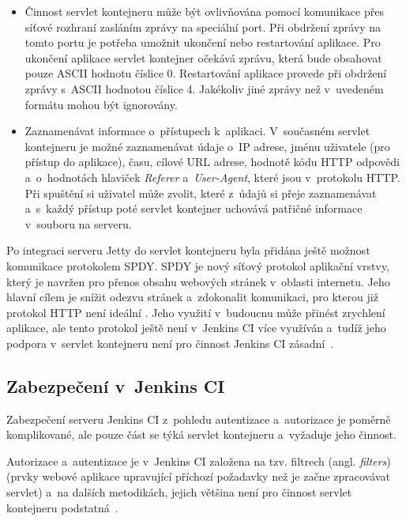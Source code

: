 \begin{itemize}
                \item Činnost servlet kontejneru může být ovlivňována pomocí komunikace přes síťové rozhraní zasláním zprávy
                    na speciální port. Při obdržení zprávy na tomto portu je potřeba umožnit ukončení nebo restartování aplikace.
                    Pro ukončení aplikace servlet kontejner očekává zprávu, která bude obsahovat pouze ASCII hodnotu číslice 0.
                    Restartování aplikace provede při obdržení zprávy s~ASCII hodnotou číslice 4. Jakékoliv
                    jiné zprávy než v~uvedeném formátu mohou být ignorovány.

                \item Zaznamenávat informace o~přístupech k~aplikaci. V~současném servlet kontejneru je možné zaznamenávat
                    údaje o~IP adrese, jménu uživatele (pro přístup do aplikace), času, cílové URL adrese, hodnotě 
                    kódu HTTP odpovědi a~o~hodnotách hlaviček \emph{Referer} a~\emph{User-Agent}, které jsou v~protokolu HTTP.
                    Při spuštění si uživatel může zvolit, které z~údajů si přeje zaznamenávat a~s~každý přístup poté 
                    servlet kontejner uchovává patřičné informace v~souboru na serveru.

            \end{itemize}
            

            Po integraci serveru Jetty do servlet kontejneru byla přidána ještě možnost
            komunikace protokolem SPDY. SPDY je nový síťový protokol aplikační vrstvy, který je
            navržen pro přenos obsahu webových stránek v~oblasti internetu. Jeho hlavní cílem je snížit odezvu stránek a~zdokonalit
            komunikaci, pro kterou již protokol HTTP není ideální \cite{spdyArticle}.
            Jeho využití v~budoucnu může přinést zrychlení aplikace, ale 
            tento protokol ještě není 
            v~Jenkins CI více využíván a~tudíž jeho podpora v~servlet kontejneru není pro činnost Jenkins CI zásadní~\cite{kohsukeTopic}.
        
        \subsection{Zabezpečení v~Jenkins CI} \label{secSecurityArchitecture}
            Zabezpečení serveru Jenkins CI z~pohledu autentizace a~autorizace je poměrně komplikované,
            ale pouze část se týká servlet kontejneru a~vyžaduje jeho činnost. 
            
            Autorizace a~autentizace je v~Jenkins CI založena na tzv. filtrech (angl. \emph{filters})
            (prvky webové aplikace upravující příchozí požadavky než je začne zpracovávat servlet) 
            a~na dalších metodikách, jejich většina není pro činnost servlet kontejneru podstatná~\cite{securityArchitectureJenkins}. 
            
